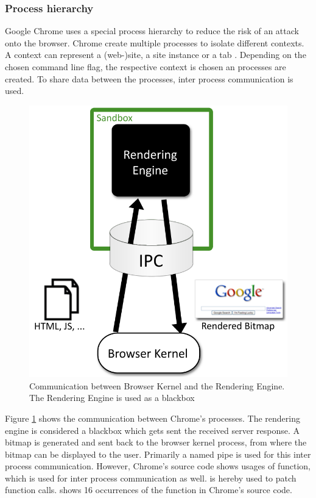 \subsubsection{Process hierarchy}
Google Chrome uses a special process hierarchy to reduce the risk of an attack onto the browser. Chrome create multiple processes to isolate different contexts. A context can represent a (web-)site, a site instance or a tab \cite{chromium_process_models}. Depending on the chosen command line flag, the respective context is chosen an processes are created. To share data between the processes, inter process communication is used.
\begin{figure}[hbtp]
\centering
\includegraphics[scale=0.5]{sections/background/chrome/communication.png}
\caption{Communication between Browser Kernel and the Rendering Engine. The Rendering Engine is used as a blackbox \cite{chromium_security_architecture}}
\label{fig:chrome_communication}
\end{figure}
Figure \ref{fig:chrome_communication} shows the communication between Chrome's processes. The rendering engine is considered a blackbox which gets sent the received server response. A bitmap is generated and sent back to the browser kernel process, from where the bitmap can be displayed to the user. Primarily a named pipe \cite{chromium_security_architecture} is used for this inter process communication. However, Chrome's source code shows usages of  function, which is used for inter process communication as well.  is hereby used to patch function calls. \cite{chromium_source_writeprocessmemory} shows 16 occurrences of the  function in Chrome's source code.